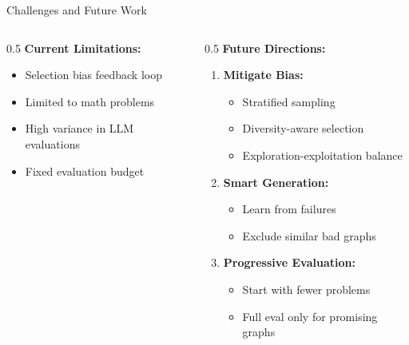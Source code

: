 \documentclass[aspectratio=169]{beamer}
\begin{document}
\begin{frame}{Challenges and Future Work}
    \begin{columns}[T]
        \begin{column}{0.5\textwidth}
            \textbf{Current Limitations:}
            \begin{itemize}
                \item Selection bias feedback loop
                \item Limited to math problems
                \item High variance in LLM evaluations
                \item Fixed evaluation budget
            \end{itemize}
            
        \end{column}
        \begin{column}{0.5\textwidth}
            \textbf{Future Directions:}
            \begin{enumerate}
                \item \textbf{Mitigate Bias:}
                \begin{itemize}
                    \item Stratified sampling
                    \item Diversity-aware selection
                    \item Exploration-exploitation balance
                \end{itemize}
                
                \item \textbf{Smart Generation:}
                \begin{itemize}
                    \item Learn from failures
                    \item Exclude similar bad graphs
                \end{itemize}
                
                \item \textbf{Progressive Evaluation:}
                \begin{itemize}
                    \item Start with fewer problems
                    \item Full eval only for promising graphs
                \end{itemize}
            \end{enumerate}
        \end{column}
    \end{columns}
    

\end{frame}
\end{document}

